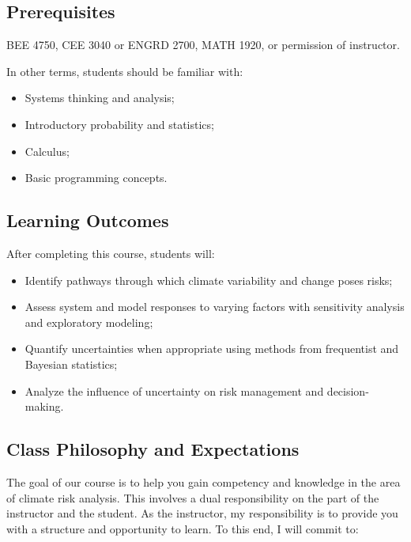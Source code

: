 \documentclass[12pt,a4paper]{article}
\begin{document}
\subsection{Prerequisites}
BEE 4750, CEE 3040 or ENGRD 2700, MATH 1920, or permission of instructor. 

In other terms, students should be familiar with:

\begin{itemize}
\item Systems thinking and analysis;


\item Introductory probability and statistics;


\item Calculus;


\item Basic programming concepts.

\end{itemize}
\subsection{Learning Outcomes}
After completing this course, students will:

\begin{itemize}
\item Identify pathways through which climate variability and change poses risks;


\item Assess system and model responses to varying factors with sensitivity analysis and exploratory modeling;


\item Quantify uncertainties when appropriate using methods from frequentist and Bayesian statistics;


\item Analyze the influence of uncertainty on risk management and decision-making.

\end{itemize}
\subsection{Class Philosophy and Expectations}
The goal of our course is to help you gain competency and knowledge in the area of climate risk analysis. This involves a dual responsibility on the part of the instructor and the student. As the instructor, my responsibility is to provide you with a structure and opportunity to learn. To this end, I will commit to:
\end{document}
